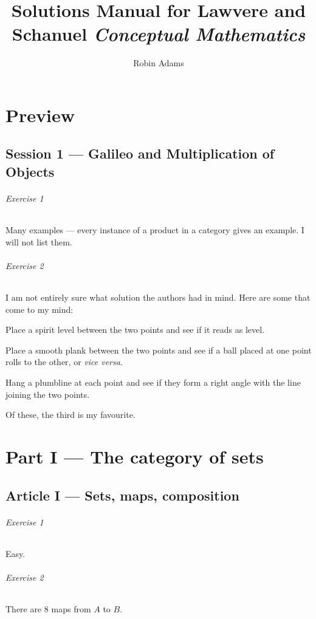 \documentclass{report}
\title{Solutions Manual for Lawvere and Schanuel \emph{Conceptual Mathematics}}
\author{Robin Adams}
\begin{document}
    \maketitle
    \tableofcontents

    \part{Preview}
    \chapter{Session 1 --- Galileo and Multiplication of Objects}
    \paragraph{Exercise 1}
    Many examples --- every instance of a product in a category gives an example. I will not list them.

    \paragraph{Exercise 2}
    I am not entirely sure what solution the authors had in mind. Here are some that come to my mind:

    Place a spirit level between the two points and see if it reads as level.

    Place a smooth plank between the two points and see if a ball placed at one point rolls to the other,
    or \emph{vice versa}.

    Hang a plumbline at each point and see if they form a right angle with the line joining the two points.

    Of these, the third is my favourite.

    \part{Part I --- The category of sets}

    \chapter{Article I --- Sets, maps, composition}

    \paragraph{Exercise 1}
    Easy.

    \paragraph{Exercise 2}
    There are 8 maps from $A$ to $B$.
\end{document}
